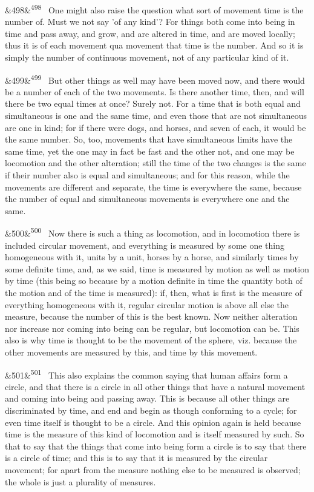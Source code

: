 \documentclass[12pt]{article}
\newcommand{\para}[1][]{\par\noindent\ifx&#1&\else\textsuperscript{\footnotesize #1}~\fi}
\begin{document}
\para[498] One might also raise the question what sort of movement time is the number of. Must we not say 'of any kind'? For things both come into being in time and pass away, and grow, and are altered in time, and are moved locally; thus it is of each movement qua movement that time is the number. And so it is simply the number of continuous movement, not of any particular kind of it.

\para[499] But other things as well may have been moved now, and there would be a number of each of the two movements. Is there another time, then, and will there be two equal times at once? Surely not. For a time that is both equal and simultaneous is one and the same time, and even those that are not simultaneous are one in kind; for if there were dogs, and horses, and seven of each, it would be the same number. So, too, movements that have simultaneous limits have the same time, yet the one may in fact be fast and the other not, and one may be locomotion and the other alteration; still the time of the two changes is the same if their number also is equal and simultaneous; and for this reason, while the movements are different and separate, the time is everywhere the same, because the number of equal and simultaneous movements is everywhere one and the same.

\para[500] Now there is such a thing as locomotion, and in locomotion there is included circular movement, and everything is measured by some one thing homogeneous with it, units by a unit, horses by a horse, and similarly times by some definite time, and, as we said, time is measured by motion as well as motion by time (this being so because by a motion definite in time the quantity both of the motion and of the time is measured): if, then, what is first is the measure of everything homogeneous with it, regular circular motion is above all else the measure, because the number of this is the best known. Now neither alteration nor increase nor coming into being can be regular, but locomotion can be. This also is why time is thought to be the movement of the sphere, viz. because the other movements are measured by this, and time by this movement.

\para[501] This also explains the common saying that human affairs form a circle, and that there is a circle in all other things that have a natural movement and coming into being and passing away. This is because all other things are discriminated by time, and end and begin as though conforming to a cycle; for even time itself is thought to be a circle. And this opinion again is held because time is the measure of this kind of locomotion and is itself measured by such. So that to say that the things that come into being form a circle is to say that there is a circle of time; and this is to say that it is measured by the circular movement; for apart from the measure nothing else to be measured is observed; the whole is just a plurality of measures.
\end{document}
